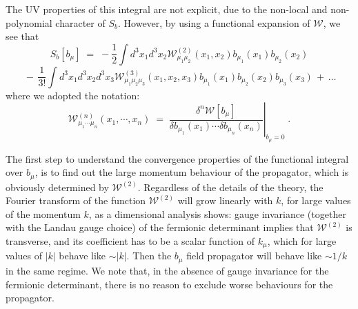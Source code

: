 \documentclass[a4paper,12pt]{article}
\begin{document}
The UV properties of this integral are not explicit, due to the
non-local and non-polynomial character of $S_b$. However, by using a
functional expansion of ${\mathcal W}$, we see that
$$
S_b[b_\mu]\;=\; - \frac{1}{2}\int d^3x_1 d^3x_2 {\mathcal
    W}^{(2)}_{\mu_1\mu_2}(x_1,x_2) b_{\mu_1}(x_1) b_{\mu_2}(x_2)
$$
\begin{equation}
 \label{eq:fexp}
\,-\,\frac{1}{3!}\int d^3x_1 d^3x_2 d^3x_3 {\mathcal
     W}^{(3)}_{\mu_1\mu_2\mu_3}(x_1,x_2,x_3) b_{\mu_1}(x_1) b_{\mu_2}(x_2)
   b_{\mu_3}(x_3) \,+\, \ldots
\end{equation}
where we adopted the notation:
\begin{equation}
  \label{eq:defdw}
  {\mathcal W}^{(n)}_{\mu_1\cdots\mu_n}(x_1,\cdots,x_n)\;=\;
 \left. \frac{\delta^n{\mathcal W}[b_\mu]}{\delta b_{\mu_1}(x_1)
     \cdots \delta b_{\mu_n}(x_n)}\right|_{b_\mu = 0} \;.
\end{equation}

The first step to understand the convergence properties of the
functional integral over $b_\mu$, is to find out the large momentum
behaviour of the propagator, which is obviously determined by
${\mathcal W}^{(2)}$. Regardless of the details of the theory, the
Fourier transform of the function ${\mathcal W}^{(2)}$ will grow
linearly with $k$, for large values of the momentum $k$, as a
dimensional analysis shows: gauge invariance (together with the Landau
gauge choice) of the fermionic determinant implies that ${\mathcal
  W}^{(2)}$ is transverse, and its coefficient has to be a scalar
function of $k_\mu$, which for large values of $|k|$ behave like $\sim
|k|$.  Then the $b_\mu$ field propagator will behave like $\sim 1/k$
in the same regime.  We note that, in the absence of gauge invariance
for the fermionic determinant, there is no reason to exclude worse
behaviours for the propagator.
\end{document}
